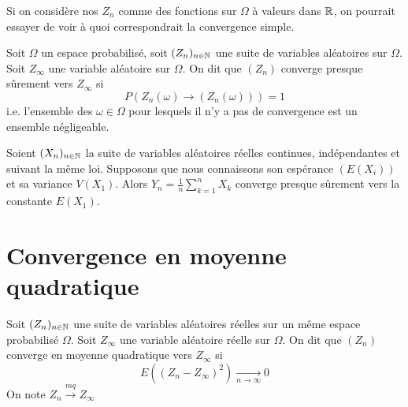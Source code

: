 Si on considère nos $Z_n$ comme des fonctions sur $\Omega$ à valeurs dans $\mathbb{R}$, on pourrait essayer de voir à quoi correspondrait la convergence simple.

\begin{comment}
    \begin{example}
        Soit $(\omega_k)_{k \in \N} \in \Omega = \{0, 1\}^\N$. Posons $X_n = \omega_n$.
        Sur $\Omega$ on a la probabilité "définie" par le fait que si 
            \[ A_{\{ \varepsilon_0, \dots , \varepsilon \}} = \Bigl\{ \omega \in \Omega, \omega_i = \varepsilon_i, \forall i \in \{0, 1, \dots, n\} \Bigl\} \]
        alors 
            \[ \forall \varepsilon \in \{0, 1\}, \Theta \in ]0, 1[,  \quad P(A) = \Theta ^{\sum_{i=0}^{n} \varepsilon i} \bigl( 1 - \Theta \bigr)^{\sum_{i=0}^{n} (1- \varepsilon_i)} \] 
        Donc 
    \end{example}
\end{comment}

\begin{definition}
    Soit $\Omega$ un espace probabilisé, soit $(Z_n)_{n \in \mathbb{N}}$ une suite de variables aléatoires sur $\Omega$.
    Soit $Z_\infty$ une variable aléatoire sur $\Omega$. On dit que $(Z_n)$ converge presque sûrement vers $Z_\infty$ si 
        \[ P(Z_n(\omega) \longrightarrow (Z_n(\omega))) = 1 \] 
    i.e. l'ensemble des $\omega \in \Omega$ pour lesquels il n'y a pas de convergence est un ensemble négligeable.    
\end{definition}

\begin{theorem}
    Soient $(X_n)_{n \in \mathbb{N}}$ la suite de variables aléatoires réelles continues, indépendantes et suivant la même loi. 
    Supposons que nous connaissons son espérance $(E(X_i))$ et sa variance $V(X_1)$.
    Alors $Y_n = \frac{1}{n} \sum_{k=1}^{n} X_k$ converge presque sûrement vers la constante $E(X_1)$.    
\end{theorem}




\section*{Convergence en moyenne quadratique}

\begin{definition}
    Soit $(Z_n)_{n \in \mathbb{N}}$ une suite de variables aléatoires réelles sur un même espace probabilisé $\Omega$.
    Soit $Z_\infty$ une variable aléatoire réelle sur $\Omega$. On dit que $(Z_n)$ converge en moyenne quadratique vers $Z_\infty$ si 
        \[ E((Z_n - Z_\infty)^2) \underset{n \to \infty}{\longrightarrow} 0 \] 
    On note $Z_n \stackrel{mq}{\longrightarrow} Z_\infty $
\end{definition}

